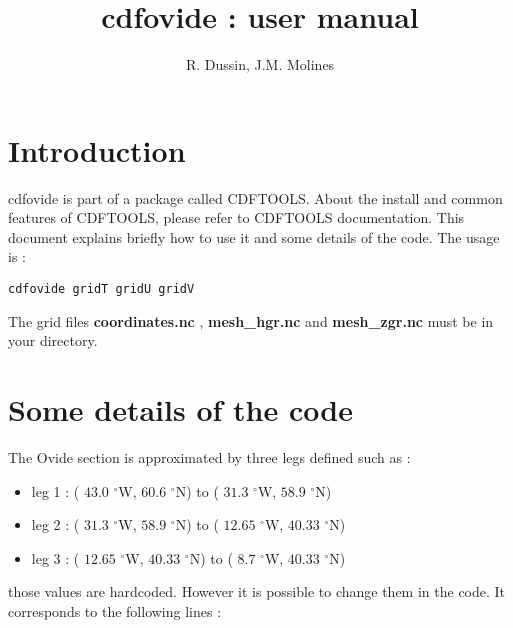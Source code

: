 \documentclass[a4paper,11pt]{article}
\begin{document}
\newcommand{\etal}{{\it et al.}}
\newcommand{\DegN}{$^{\circ}$N}
\newcommand{\DegW}{$^{\circ}$W}
\newcommand{\DegE}{$^{\circ}$E}
\newcommand{\DegS}{$^{\circ}$S}
\newcommand{\Deg}{$^{\circ}$}
\newcommand{\DegC}{$^{\circ}$C}


\title{cdfovide : user manual}  

\author{R. Dussin, J.M. Molines}

\maketitle

\section{Introduction}

cdfovide is part of a package called CDFTOOLS. About the install and common features of CDFTOOLS, please refer to CDFTOOLS documentation.
This document explains briefly how to use it and some details of the code. The usage is :

\begin{verbatim}
cdfovide gridT gridU gridV
\end{verbatim}

\noindent
The grid files \textbf{coordinates.nc} , \textbf{mesh\_hgr.nc} and \textbf{mesh\_zgr.nc} must be in your directory.

\section{Some details of the code}

The Ovide section is approximated by three legs defined such as :

\begin{itemize}
\item leg 1 : ( $43.0$ \DegW , $60.6$ \DegN ) to ( $31.3$ \DegW , $58.9$ \DegN )
\item leg 2 : ( $31.3$ \DegW , $58.9$ \DegN ) to ( $12.65$ \DegW , $40.33$ \DegN )
\item leg 3 : ( $12.65$ \DegW , $40.33$ \DegN ) to ( $8.7$ \DegW , $40.33$ \DegN )
\end{itemize}

\noindent
those values are hardcoded. However it is possible to change them in the code. It corresponds to the following lines :
\end{document}
